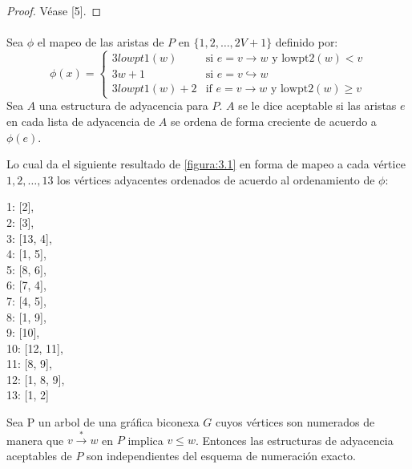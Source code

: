 \begin{proof}
Véase [5].
\end{proof}

\paragraph{}
Sea $\phi$ el mapeo de las aristas de $P$ en $\{1, 2, \ldots, 2V + 1\}$ definido por:
\begin{equation*}
\phi(x) =
\begin{cases}
3lowpt1(w) & \text{si $e = v \rightarrow w$ y lowpt$2(w) < v$}\\
3w + 1 & \text{si $e = v \hookrightarrow w$}\\
3lowpt1(w) + 2 & \text{if $e = v \rightarrow w$ y lowpt$2(w) \geq v$}
\end{cases}
\end{equation*}
Sea $A$ una estructura de adyacencia para $P$. $A$ se le dice aceptable si las aristas $e$ en cada lista de adyacencia de $A$ se ordena de forma creciente de acuerdo a $\phi(e)$.

Lo cual da el siguiente resultado de \ref{figura:3.1} en forma de mapeo a cada vértice $1, 2,\ldots, 13$ los vértices adyacentes ordenados de acuerdo al ordenamiento de $\phi$:
\begin{center}
1: [2],\\
 2: [3],\\
 3: [13, 4],\\
 4: [1, 5],\\
 5: [8, 6],\\
 6: [7, 4],\\
 7: [4, 5],\\
 8: [1, 9],\\
 9: [10],\\
 10: [12, 11],\\
 11: [8, 9],\\
 12: [1, 8, 9],\\
 13: [1, 2]
\end{center}
 
\begin{lemma}
Sea P un arbol de una gráfica biconexa $G$ cuyos vértices son numerados de manera que  $v \overset{\ast}{\rightarrow} w$ en $P$ implica $v \le w$. Entonces las estructuras de adyacencia aceptables de $P$ son independientes del esquema de numeración exacto.
\label{lema:3.8}
\end{lemma}

